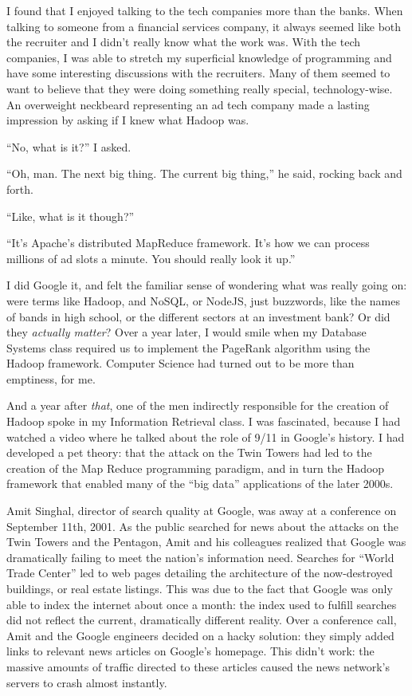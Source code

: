 \documentclass[12pt]{article}
\begin{document}
I found that I enjoyed talking to the tech companies more than the banks.  When
talking to someone from a financial services company, it always seemed like both
the recruiter and I didn't really know what the work was.  With the tech
companies, I was able to stretch my superficial knowledge of programming and
have some interesting discussions with the recruiters.  Many of them seemed to
want to believe that they were doing something really special, technology-wise.
An overweight neckbeard representing an ad tech company made a lasting impression 
by asking if I knew what Hadoop was.  

``No, what is it?'' I asked.

``Oh, man.  The next big thing.  The current big thing,'' he said,
rocking back and forth.

``Like, what is it though?''

``It's Apache's distributed MapReduce framework.  It's how we can process
millions of ad slots a minute.  You should really look it up.''

I did Google it, and felt the familiar sense of wondering what was really going
on: were terms like Hadoop, and NoSQL, or NodeJS, just buzzwords, like the names
of bands in high school, or the different sectors at an investment bank?  Or did
they \textit{actually matter}?  Over a year later, I would smile when my Database Systems class
required us to implement the PageRank algorithm using the Hadoop framework.
Computer Science had turned out to be more than emptiness, for me.

And a year after \textit{that}, one of the men indirectly responsible for the
creation of Hadoop spoke in my Information Retrieval class.  I was fascinated,
because I had watched a video where he talked about the role of 9/11 in Google's
history.  I had developed a pet theory: that the attack on the Twin Towers had
led to the creation of the Map Reduce programming paradigm, and in turn the
Hadoop framework that enabled many of the ``big data'' applications of the later
2000s.

Amit Singhal, director of search quality at Google, was away at a conference on
September 11th, 2001. As the public searched for news about the attacks on the
Twin Towers and the Pentagon, Amit and his colleagues realized that Google was
dramatically failing to meet the nation's information need. Searches for ``World
Trade Center'' led to web pages detailing the architecture of the now-destroyed
buildings, or real estate listings.  This was due to the fact that Google was
only able to index the internet about once a month: the index used to fulfill
searches did not reflect the current, dramatically different reality.  Over a
conference call, Amit and the Google engineers decided on a hacky solution: they
simply added links to relevant news articles on Google's homepage.  This didn't
work: the massive amounts of traffic directed to these articles caused the news
network's servers to crash almost instantly.
\end{document}
